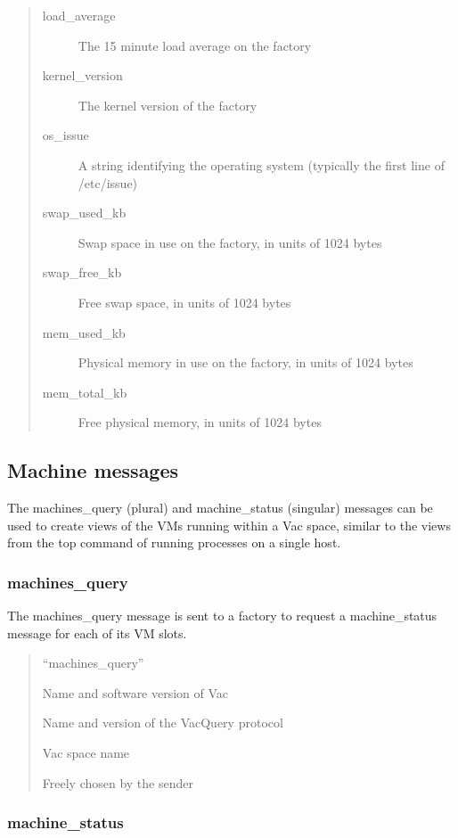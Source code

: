 \documentclass[12pt,a4paper]{article}
\begin{document}
\begin{quote}
\begin{description}
\item[load\_average] The 15 minute load average on the factory
\item[kernel\_version] The kernel version of the factory
\item[os\_issue] A string identifying the operating system (typically the first line of /etc/issue)
\item[swap\_used\_kb] Swap space in use on the factory, in units of 1024 bytes
\item[swap\_free\_kb] Free swap space, in units of 1024 bytes
\item[mem\_used\_kb] Physical memory in use on the factory, in units of 1024 bytes
\item[mem\_total\_kb] Free physical memory, in units of 1024 bytes
\end{description}
\end{quote}

\subsection{Machine messages}
\label{sec:machinemessages}

The machines\_query (plural) and machine\_status (singular) messages can
be used to create views of the VMs running within a Vac space, similar to
the views from the top command of running processes on a single host.

\subsubsection{machines\_query}
\label{sec:machinesquery}

The machines\_query message is sent to a factory to request a 
machine\_status message for each of its VM slots.

\begin{quote}
\begin{description}
\setlength{\parskip}{0pt}
\item[message\_type] ``machines\_query''
\item[vac\_version] Name and software version of Vac
\item[vacquery\_version] Name and version of the VacQuery protocol
\item[space] Vac space name
\item[cookie] Freely chosen by the sender
\end{description}
\end{quote}

\subsubsection{machine\_status}
\label{sec:machinestatus}
\end{document}
